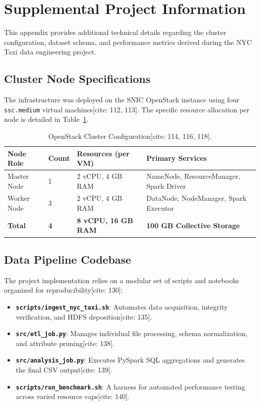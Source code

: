 \section{Supplemental Project Information}
\label{sec:appendix}

This appendix provides additional technical details regarding the cluster configuration, dataset schema, and performance metrics derived during the NYC Taxi data engineering project.

\subsection{Cluster Node Specifications}
The infrastructure was deployed on the SNIC OpenStack instance using four \texttt{ssc.medium} virtual machines[cite: 112, 113]. The specific resource allocation per node is detailed in Table~\ref{tab:cluster-specs}.

\begin{table}[H]
    \centering
    \caption{OpenStack Cluster Configuration[cite: 114, 116, 118].}
    \label{tab:cluster-specs}
    \begin{tabular}{llll}
        \hline
        \textbf{Node Role} & \textbf{Count} & \textbf{Resources (per VM)} & \textbf{Primary Services} \\
        \hline
        Master Node & 1 & 2 vCPU, 4 GB RAM & NameNode, ResourceManager, Spark Driver \\
        Worker Node & 3 & 2 vCPU, 4 GB RAM & DataNode, NodeManager, Spark Executor \\
        \hline
        \textbf{Total} & \textbf{4} & \textbf{8 vCPU, 16 GB RAM} & \textbf{100 GB Collective Storage} \\
        \hline
    \end{tabular}
\end{table}

\subsection{Data Pipeline Codebase}
The project implementation relies on a modular set of scripts and notebooks organized for reproducibility[cite: 130]:
\begin{itemize}
    \item \textbf{\texttt{scripts/ingest\_nyc\_taxi.sh}}: Automates data acquisition, integrity verification, and HDFS deposition[cite: 135].
    \item \textbf{\texttt{src/etl\_job.py}}: Manages individual file processing, schema normalization, and attribute pruning[cite: 138].
    \item \textbf{\texttt{src/analysis\_job.py}}: Executes PySpark SQL aggregations and generates the final CSV output[cite: 139].
    \item \textbf{\texttt{scripts/run\_benchmark.sh}}: A harness for automated performance testing across varied resource caps[cite: 140].
\end{itemize}

